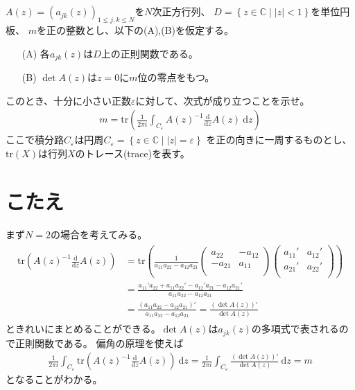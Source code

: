 \documentclass{jsarticle}
\def\diff{\textrm{d}}
\begin{document}
\section*{}
$A(z)=(a_{jk}(z))_{1\leq j,k\leq N}$を$N$次正方行列、
$D=\left\{z\in\mathbb{C}\mid |z|<1\right\}$を単位円板、
$m$を正の整数とし、以下の(A),(B)を仮定する。
\begin{enumerate}
\item[(A)] 各$a_{jk}(z)$は$D$上の正則関数である。
\item[(B)] $\det A(z)$は$z=0$に$m$位の零点をもつ。 
\end{enumerate}
このとき、十分に小さい正数$\varepsilon$に対して、次式が成り立つことを示せ。
\begin{align*}
m=\mathrm{tr}\left(\frac{1}{2\pi i}\int_{C_{\varepsilon}}A(z)^{-1}\frac{\diff}{\diff z}A(z)~\diff z\right)
\end{align*}
ここで積分路$C_{\varepsilon}$は円周$C_{\varepsilon}=\left\{z\in\mathbb{C}\mid |z|=\varepsilon\right\}$
を正の向きに一周するものとし、$\mathrm{tr}(X)$は行列$X$のトレース(trace)を表す。

\section*{こたえ}
まず$N=2$の場合を考えてみる。
\begin{align*}
\begin{aligned}
\mathrm{tr}\left(A(z)^{-1}\frac{\diff}{\diff z}A(z)\right)
&=\mathrm{tr}\left(\frac{1}{a_{11}a_{22}-a_{12}a_{21}}
\begin{pmatrix}
    a_{22} & -a_{12} \\
    -a_{21} & a_{11} \\
\end{pmatrix}
\begin{pmatrix}
    a_{11}' & a_{12}' \\
    a_{21}' & a_{22}' \\
\end{pmatrix}
\right)\\
&=\frac{a_{11}'a_{22}+a_{11}a_{22}'-a_{12}'a_{21}-a_{12}a_{21}'}{a_{11}a_{22}-a_{12}a_{21}}\\
&=\frac{\left(a_{11}a_{22}-a_{12}a_{21}\right)'}{a_{11}a_{22}-a_{12}a_{21}}
=\frac{\left(\det A(z)\right)'}{\det A(z)}
\end{aligned}
\end{align*}
ときれいにまとめることができる。$\det A(z)$は$a_{jk}(z)$の多項式で表されるので正則関数である。
偏角の原理を使えば
\begin{align*}
\frac{1}{2\pi i}\int_{C_{\varepsilon}}\mathrm{tr}\left(A(z)^{-1}\frac{\diff}{\diff z}A(z)\right)~\diff z=\frac{1}{2\pi i}\int_{C_{\varepsilon}}\frac{\left(\det A(z)\right)'}{\det A(z)}~\diff z=m
\end{align*}
となることがわかる。
\end{document}

